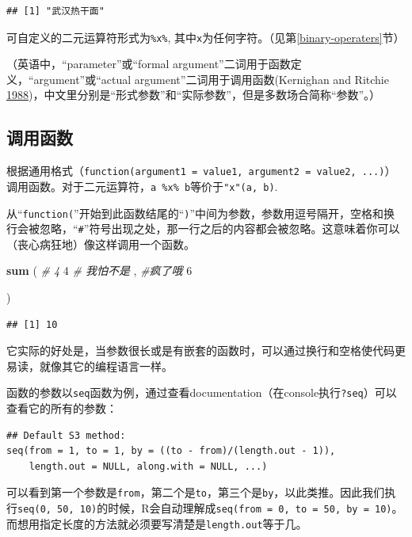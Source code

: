 \documentclass[]{book}
\newenvironment{Shaded}{\begin{snugshade}}{\end{snugshade}}
\newcommand{\CommentTok}[1]{\textcolor[rgb]{0.56,0.35,0.01}{\textit{#1}}}
\newcommand{\DecValTok}[1]{\textcolor[rgb]{0.00,0.00,0.81}{#1}}
\newcommand{\KeywordTok}[1]{\textcolor[rgb]{0.13,0.29,0.53}{\textbf{#1}}}
\newcommand{\NormalTok}[1]{#1}
\begin{document}
\begin{verbatim}
## [1] "武汉热干面"
\end{verbatim}

可自定义的二元运算符形式为\texttt{\%x\%}, 其中\texttt{x}为任何字符。（见第\ref{binary-operaters}节）

（英语中，``parameter''或``formal argument''二词用于函数定义，``argument''或``actual argument''二词用于调用函数(Kernighan and Ritchie \protect\hyperlink{ref-Kernighan1988The-C-Programming-La}{1988})，中文里分别是``形式参数''和``实际参数''，但是多数场合简称``参数''。）

\hypertarget{abbr}{%
\subsection{调用函数}\label{abbr}}

根据通用格式（\texttt{function(argument1\ =\ value1,\ argument2\ =\ value2,\ ...)}）调用函数。对于二元运算符，\texttt{a\ \%x\%\ b}等价于\texttt{"x"(a,\ b)}.

从``\texttt{function(}''开始到此函数结尾的``\texttt{)}''中间为参数，参数用逗号隔开，空格和换行会被忽略，``\texttt{\#}''符号出现之处，那一行之后的内容都会被忽略。这意味着你可以（丧心病狂地）像这样调用一个函数。

\begin{Shaded}
\begin{Highlighting}[]
\KeywordTok{sum}\NormalTok{        (}
 \CommentTok{# 4   }
        \DecValTok{4} \CommentTok{# 我怕不是}
\NormalTok{,              }\CommentTok{#疯了哦}
            \DecValTok{6}
  
\NormalTok{  )}
\end{Highlighting}
\end{Shaded}

\begin{verbatim}
## [1] 10
\end{verbatim}

它实际的好处是，当参数很长或是有嵌套的函数时，可以通过换行和空格使代码更易读，就像其它的编程语言一样。

函数的参数以\texttt{seq}函数为例，通过查看documentation（在console执行\texttt{?seq}）可以查看它的所有的参数：

\begin{verbatim}
## Default S3 method:
seq(from = 1, to = 1, by = ((to - from)/(length.out - 1)),
    length.out = NULL, along.with = NULL, ...)
\end{verbatim}

可以看到第一个参数是\texttt{from}，第二个是\texttt{to}，第三个是\texttt{by}，以此类推。因此我们执行\texttt{seq(0,\ 50,\ 10)}的时候，R会自动理解成\texttt{seq(from\ =\ 0,\ to\ =\ 50,\ by\ =\ 10)}。而想用指定长度的方法就必须要写清楚是\texttt{length.out}等于几。
\end{document}
